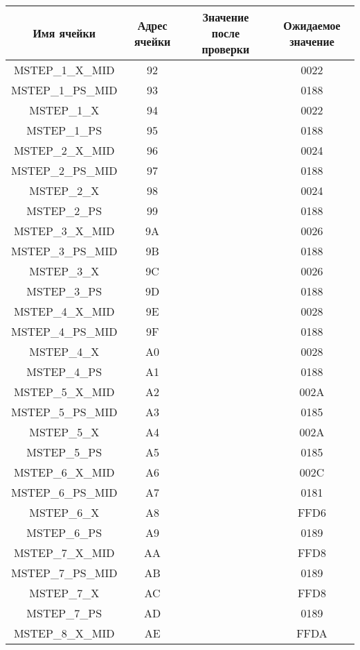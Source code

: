 \begin{center}
	\begin{tabular}{|c|c|c|c|}
		\hline
		Имя ячейки & Адрес ячейки & Значение после проверки & Ожидаемое значение \\
		\hline \hline
		MSTEP\_1\_X\_MID  & 92 &    & 0022 \\ \hline
		MSTEP\_1\_PS\_MID & 93 &  & 0188 \\\hline
		MSTEP\_1\_X & 94 &  & 0022 \\\hline
		MSTEP\_1\_PS & 95 &  & 0188 \\\hline
		MSTEP\_2\_X\_MID & 96 &  & 0024 \\\hline
		MSTEP\_2\_PS\_MID & 97 &  & 0188 \\\hline
		MSTEP\_2\_X & 98 &  & 0024 \\\hline
		MSTEP\_2\_PS & 99 &  & 0188 \\\hline
		MSTEP\_3\_X\_MID & 9A &  & 0026 \\\hline
		MSTEP\_3\_PS\_MID & 9B &  & 0188 \\\hline
		MSTEP\_3\_X & 9C &  & 0026 \\\hline
		MSTEP\_3\_PS & 9D &  & 0188 \\\hline
		MSTEP\_4\_X\_MID & 9E &  & 0028 \\\hline
		MSTEP\_4\_PS\_MID & 9F &  & 0188 \\\hline
		MSTEP\_4\_X & A0 &  & 0028 \\\hline
		MSTEP\_4\_PS & A1 &  & 0188 \\\hline
		MSTEP\_5\_X\_MID & A2 &  & 002A \\\hline
		MSTEP\_5\_PS\_MID & A3 &  & 0185 \\\hline
		MSTEP\_5\_X & A4 &  & 002A \\\hline
		MSTEP\_5\_PS & A5 &  & 0185 \\\hline
		MSTEP\_6\_X\_MID & A6 &  & 002C \\\hline
		MSTEP\_6\_PS\_MID & A7 &  & 0181 \\\hline
		MSTEP\_6\_X & A8 &  & FFD6 \\\hline
		MSTEP\_6\_PS & A9 &  & 0189 \\\hline
		MSTEP\_7\_X\_MID & AA &  & FFD8 \\\hline
		MSTEP\_7\_PS\_MID & AB &  & 0189 \\\hline
		MSTEP\_7\_X & AC &  & FFD8 \\\hline
		MSTEP\_7\_PS & AD &  & 0189 \\\hline
		MSTEP\_8\_X\_MID & AE &  & FFDA \\\hline

\end{tabular}
\end{center}

